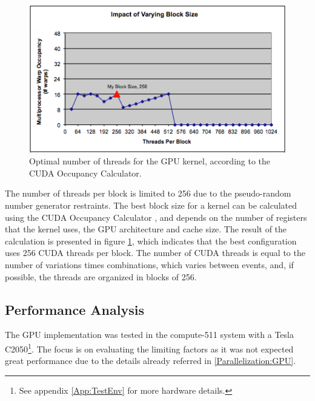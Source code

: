 \begin{figure}[!htp]
	\begin{center}
		\includegraphics[scale=0.6]{../../common/graphs/block_size_gpu.png}
		\caption{Optimal number of threads for the GPU kernel, according to the \nvidia CUDA Occupancy Calculator.}
		\label{fig:GPUCalc}
	\end{center}
\end{figure}

The number of threads per block is limited to 256 due to the pseudo-random number generator restraints. The best block size for a kernel can be calculated using the \nvidia CUDA Occupancy Calculator \cite{NVIDIA:Calculator}, and depends on the number of registers that the kernel uses, the GPU architecture and cache size. The result of the calculation is presented in figure \ref{fig:GPUCalc}, which indicates that the best configuration uses 256 CUDA threads per block. The number of CUDA threads is equal to the number of variations times combinations, which varies between events, and, if possible, the threads are organized in blocks of 256.

\subsection{Performance Analysis}
\label{GPUPerformance}

The GPU implementation was tested in the compute-511 system with a \nvidia Tesla C2050\footnote{See appendix \ref{App:TestEnv} for more hardware details.}. The focus is on evaluating the limiting factors as it was not expected great performance due to the details already referred in \ref{Parallelization:GPU}.

